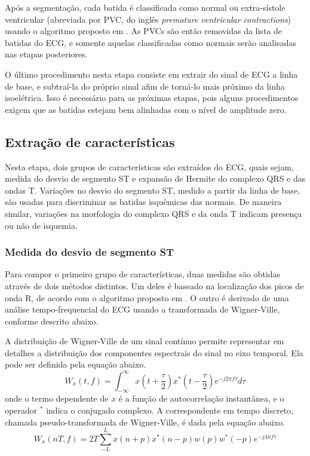 Após a segmentação, cada batida é classificada como normal ou extra-sístole ventricular (abreviada por PVC, do inglês \emph{premature ventricular contractions}) usando o algoritmo proposto em \cite{Couceiro08}. As PVCs são então removidas da lista de batidas do ECG, e somente aquelas classificadas como normais serão analisadas nas etapas posteriores.

O último procedimento nesta etapa consiste em extrair do sinal de ECG a linha de base, e subtraí-la do próprio sinal afim de torná-lo mais próximo da linha isoelétrica. Isso é necessário para as próximas etapas, pois alguns procedimentos exigem que as batidas estejam bem alinhadas com o nível de amplitude zero.

\subsection{Extração de características}
Nesta etapa, dois grupos de características são extraídos do ECG, quais sejam, medida do desvio de segmento ST e expansão de Hermite do complexo QRS e das ondas T. Variações no desvio do segmento ST, medido a partir da linha de base, são usadas para discriminar as batidas isquêmicas das normais. De maneira similar, variações na morfologia do complexo QRS e da onda T indicam presença ou não de isquemia.

\subsubsection{Medida do desvio de segmento ST}
Para compor o primeiro grupo de características, duas medidas são obtidas através de dois métodos distintos. Um deles é baseado na localização dos picos de onda R, de acordo com o algoritmo proposto em \cite{Pang05}. O outro é derivado de uma análise tempo-frequencial do ECG usando a transformada de Wigner-Ville, conforme descrito abaixo.

A distribuição de Wigner-Ville de um sinal contínuo permite representar em detalhes a distribuição dos componentes espectrais do sinal no eixo temporal. Ela pode ser definida pela equação abaixo.
\begin{equation} \label{equ:wigner_ville}
    W_x(t,f) = \int_{-\infty}^{\infty} x\left( t+\frac{\tau}{2} \right) x^*\left( t-\frac{\tau}{2} \right) e^{-j2\pi f \tau} d\tau
\end{equation}
onde o termo dependente de $x$ é a função de autocorrelação instantânea, e o operador $^*$ indica o conjugado complexo. A correspondente em tempo discreto, chamada pseudo-transformada de Wigner-Ville, é dada pela equação abaixo.
\begin{equation} \label{equ:pseudo_wigner_ville}
    W_x(nT,f) = 2T\sum_{-L}^{L}x(n+p)x^*(n-p)w(p)w^*(-p)e^{-j4\pi f\tau}
\end{equation}

